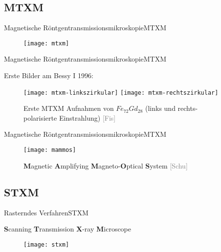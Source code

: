 \subsection{MTXM}
\begin{frame}{Magnetische Röntgentransmissionsmikroskopie}{MTXM}
	\begin{figure}[H]
		\begin{center}
			\texttt{[image: mtxm]}
		\end{center}
	\end{figure}
\end{frame}

\begin{frame}{Magnetische Röntgentransmissionsmikroskopie}{MTXM}
	\begin{block}{Erste Bilder am Bessy I 1996: }
		\begin{figure}[H]
			\begin{center}
            	\texttt{[image: mtxm-linkszirkular]}
				\texttt{[image: mtxm-rechtszirkular]}
			\end{center}
			\caption{Erste MTXM Aufnahmen von $Fe_{72} Gd_{28}$ (links und rechts-polarisierte Einstrahlung) \tiny{\textcolor{gray}{[Fis]}}}
		\end{figure}
	\end{block}
\end{frame}

\begin{frame}{Magnetische Röntgentransmissionsmikroskopie}{MTXM}
\begin{figure}[H]
	\begin{center}
		\texttt{[image: mammos]}
		\caption{\textbf{M}agnetic \textbf{A}mplifying \textbf{M}agneto-\textbf{O}ptical \textbf{S}ystem \tiny{\textcolor{gray}{[Schu]}}}
	\end{center}
\end{figure}
\end{frame}

\subsection{STXM}
\begin{frame}{Rasterndes Verfahren}{STXM}
	\begin{block}{\textbf{S}canning \textbf{T}ransmission \textbf{X}-ray \textbf{M}icroscope}
		\begin{figure}[H]
			\begin{center}
				\texttt{[image: stxm]}
			\end{center}
		\end{figure}
	\end{block}
\end{frame}


